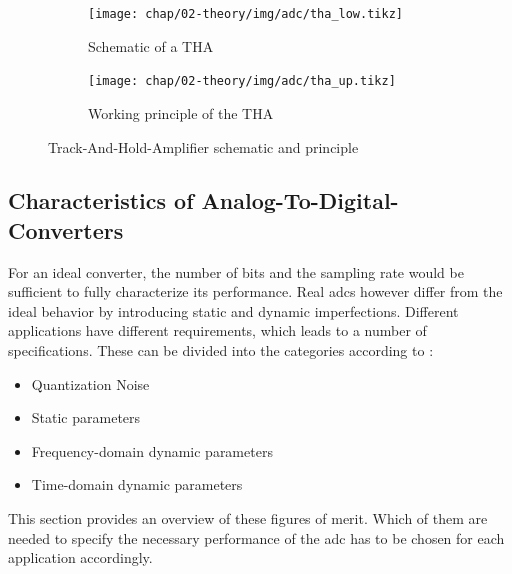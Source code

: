 \begin{figure}[tb]
	\centering
	\begin{subfigure}{\textwidth}
		\centering
		\texttt{[image: chap/02-theory/img/adc/tha\_low.tikz]}  
		\caption{Schematic of a THA}
		\label{fig:tha_low}
	\end{subfigure}
	\begin{subfigure}{\textwidth}
		\centering
		\texttt{[image: chap/02-theory/img/adc/tha\_up.tikz]}  
		\caption{Working principle of the THA}
		\label{fig:tha_up}
	\end{subfigure}
	\caption{Track-And-Hold-Amplifier schematic and principle \cite{walt}}
	\label{fig:tha_principle}
\end{figure}

\subsection{Characteristics of Analog-To-Digital-Converters}\label{ssec:adc_charac}
For an ideal converter, the number of bits and the sampling rate would be sufficient to fully characterize its performance.
Real \glspl{adc} however differ from the ideal behavior by introducing static and dynamic imperfections.
Different applications have different requirements, which leads to a number of specifications.
These can be divided into the categories according to \cite{Lundberg}:
\begin{itemize}[noitemsep]
	\item Quantization Noise
	\item Static parameters
	\item Frequency-domain dynamic parameters
	\item Time-domain dynamic parameters
\end{itemize} %
This section provides an overview of these figures of merit.
Which of them are needed to specify the necessary performance of the \gls{adc} has to be chosen for each application accordingly.

